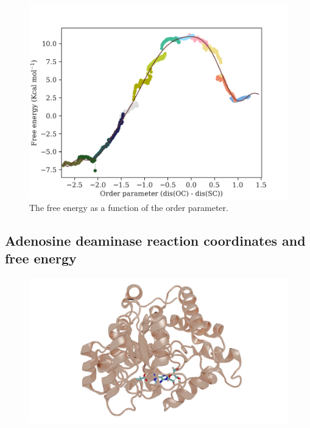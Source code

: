 \documentclass[journal=jpcbfk,manuscript=article,layout=traditional]{achemso}
\begin{document}
\begin{figure}
\includegraphics[scale=0.5]{figures/mat2a-fenergy.pdf}
\caption{The free energy as a function of the order parameter.}
\end{figure}

\subsection{Adenosine deaminase reaction coordinates and free energy}
\begin{figure}[ht!]
\includegraphics[scale=0.15]{./figures/ada-protein.png}
\end{figure}
\end{document}
